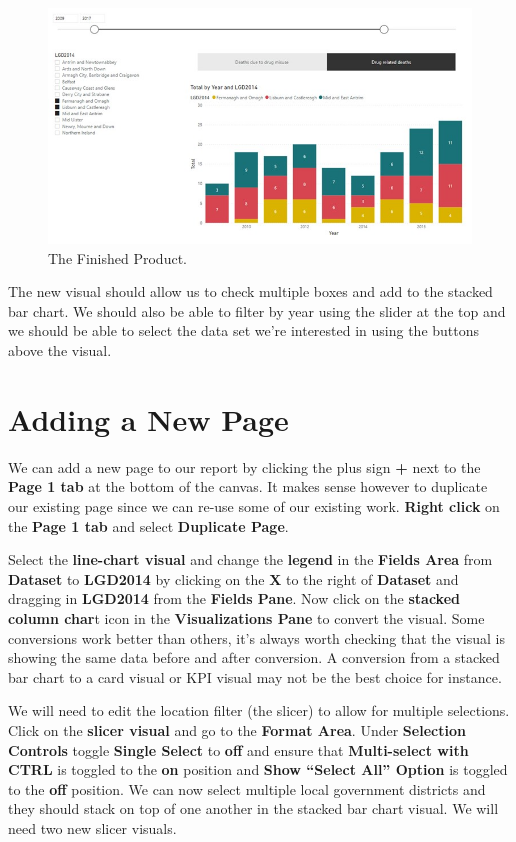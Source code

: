 \documentclass[
]{book}
\begin{document}
\begin{figure}
\centering
\includegraphics{bi10.jpg}
\caption{The Finished Product.}
\end{figure}

The new visual should allow us to check multiple boxes and add to the stacked bar chart. We should also be able to filter by year using the slider at the top and we should be able to select the data set we're interested in using the buttons above the visual.

\hypertarget{adding-a-new-page}{%
\section{Adding a New Page}\label{adding-a-new-page}}

We can add a new page to our report by clicking the plus sign \textbf{+} next to the \textbf{Page 1 tab} at the bottom of the canvas. It makes sense however to duplicate our existing page since we can re-use some of our existing work. \textbf{Right click} on the \textbf{Page 1 tab} and select \textbf{Duplicate Page}.

Select the \textbf{line-chart visual} and change the \textbf{legend} in the \textbf{Fields Area} from \textbf{Dataset} to \textbf{LGD2014} by clicking on the \textbf{X} to the right of \textbf{Dataset} and dragging in \textbf{LGD2014} from the \textbf{Fields Pane}. Now click on the \textbf{stacked column char}t icon in the \textbf{Visualizations Pane} to convert the visual. Some conversions work better than others, it's always worth checking that the visual is showing the same data before and after conversion. A conversion from a stacked bar chart to a card visual or KPI visual may not be the best choice for instance.

We will need to edit the location filter (the slicer) to allow for multiple selections. Click on the \textbf{slicer visual} and go to the \textbf{Format Area}. Under \textbf{Selection Controls} toggle \textbf{Single Select} to \textbf{off} and ensure that \textbf{Multi-select with CTRL} is toggled to the \textbf{on} position and \textbf{Show ``Select All'' Option} is toggled to the \textbf{off} position. We can now select multiple local government districts and they should stack on top of one another in the stacked bar chart visual. We will need two new slicer visuals.
\end{document}
